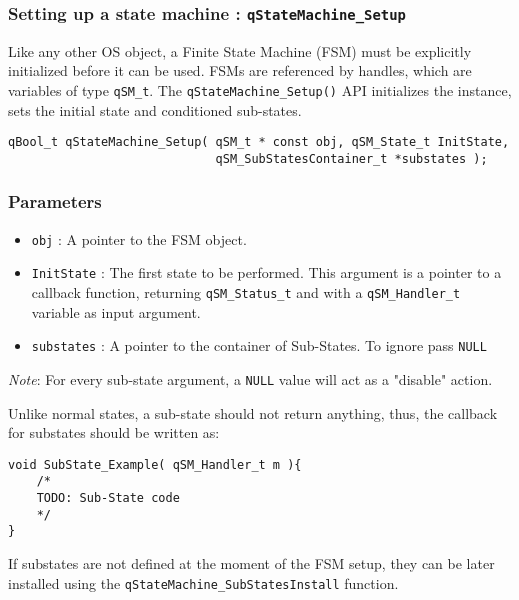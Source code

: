 \subsubsection{Setting up a state machine : \texorpdfstring{\lstinline{qStateMachine_Setup}}{qStateMachine_Setup} }
Like any other OS object, a Finite State Machine (FSM) must be explicitly initialized before it can be used. FSMs are referenced by handles, which are variables of type \lstinline{qSM_t}. 
The \lstinline{qStateMachine_Setup()} API   initializes the instance, sets the initial state and conditioned sub-states.
\medskip

\begin{lstlisting}[style=CStyle]
qBool_t qStateMachine_Setup( qSM_t * const obj, qSM_State_t InitState, 
                             qSM_SubStatesContainer_t *substates );
\end{lstlisting}

\subsubsection*{Parameters}
\begin{itemize}
    \item \lstinline{obj} : A pointer to the FSM object.
    \item \lstinline{InitState} :  The first state to be performed. This argument is a pointer to a callback function, returning \lstinline{qSM_Status_t} and with a \lstinline{qSM_Handler_t} variable as input argument.
    \item \lstinline{substates} : A pointer to the container of Sub-States. To ignore pass \lstinline{NULL}   
\end{itemize}  

\begin{tcolorbox}
\ArrowBoldDownRight \textit{Note}: For every sub-state argument, a \lstinline{NULL} value will act as a "disable" action.
\end{tcolorbox}

Unlike normal states, a sub-state should not return anything, thus, the callback for substates should be written as:
\medskip

\begin{lstlisting}[style=CStyle]
void SubState_Example( qSM_Handler_t m ){
    /*
    TODO: Sub-State code
    */
}
\end{lstlisting}  

If substates are not defined at the moment of the FSM setup, they can be later installed using the \lstinline{qStateMachine_SubStatesInstall} function.
\medskip

